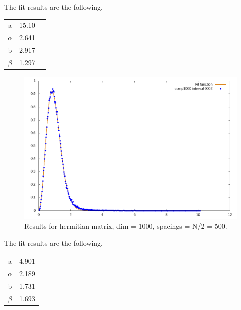 \documentclass[12pt, a4paper, notitlepage]{report}
\begin{document}
The fit results are the following.

\begin{table}[H]
	\centering
	\begin{tabular}{|c|c|c|}
		
		\hline
	
		a			& 15.10	& \\
		$\alpha$	& 2.641	& \\
		b			& 2.917	& \\
		$\beta$		& 1.297	& \\
		
		\hline
		
	\end{tabular}
\end{table}

\newpage

\begin{figure}[H]
	\centering
	\includegraphics[scale=0.6]{./Comp_1000/hist_interval_0500_fit.png}
	\caption{Results for hermitian matrix, dim = 1000, spacings = N/2 = 500.}
	\label{figure_lambdas}
\end{figure}


The fit results are the following.

\begin{table}[H]
	\centering
	\begin{tabular}{|c|c|}
		
		\hline

		a			& 4.901	\\
		$\alpha$	& 2.189	\\
		b			& 1.731	\\
		$\beta$		& 1.693	\\
		
		\hline
		
	\end{tabular}
\end{table}
\end{document}
